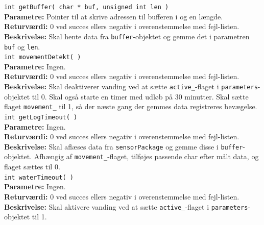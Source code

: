 \verb+int getBuffer( char * buf, unsigned int len )+ \\
\textbf{Parametre:} Pointer til at skrive adressen til bufferen i og en længde. \\
\textbf{Returværdi:} 0 ved succes ellers negativ i overenstemmelse med fejl-listen. \\
\textbf{Beskrivelse:} Skal hente data fra \verb+buffer+-objektet og gemme det i parametren \verb+buf+ og \verb+len+. \\

\verb+int movementDetekt( )+ \\
\textbf{Parametre:} Ingen. \\
\textbf{Returværdi:} 0 ved succes ellers negativ i overenstemmelse med fejl-listen. \\
\textbf{Beskrivelse:} Skal deaktiverer vanding ved at sætte \verb+active_+-flaget i \verb+parameters+-objektet til 0. Skal også starte en timer med udløb på 30 minutter. Skal sætte flaget \verb+movement_+ til 1, så der næste gang der gemmes data registreres bevægelse. \\

\verb+int getLogTimeout( )+ \\
\textbf{Parametre:} Ingen. \\
\textbf{Returværdi:} 0 ved succes ellers negativ i overenstemmelse med fejl-listen. \\
\textbf{Beskrivelse:} Skal aflæses data fra \verb+sensorPackage+ og gemme disse i \verb+buffer+-objektet. Afhængig af \verb+movement_+-flaget, tilføjes passende char efter målt data, og flaget sættes til 0. \\

\verb+int waterTimeout( )+ \\
\textbf{Parametre:} Ingen. \\
\textbf{Returværdi:} 0 ved succes ellers negativ i overenstemmelse med fejl-listen. \\
\textbf{Beskrivelse:} Skal aktivere vanding ved at sætte \verb+active_+-flaget i \verb+parameters+-objektet til 1. \\
